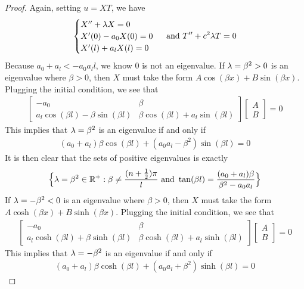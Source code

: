 \documentclass{report}
\begin{document}
\begin{proof}
Again, setting $u=XT$, we have 
 \begin{align*}
\begin{cases}
  X''+ \lambda X=0 \\
  X'(0)-a_0X(0)=0 \\
  X'(l)+a_lX(l)=0
\end{cases}\text{ and }T''+c^2 \lambda  T=0
\end{align*}
Because $a_0+a_l<-a_0a_ll$, we know $0$ is not an eigenvalue. If $\lambda =\beta ^2 >0$ is an eigenvalue where $\beta >0$, then $X$ must take the form  $A\cos (\beta x)+B \sin (\beta x)$. Plugging the initial condition, we see that 
\begin{align*}
\begin{bmatrix}
  -a_0 & \beta \\
  a_l \cos (\beta l) - \beta \sin (\beta l) & \beta  \cos (\beta l)+ a_l \sin (\beta l) 
\end{bmatrix}\begin{bmatrix}
A \\
B
\end{bmatrix}=0
\end{align*}
This implies that $\lambda =\beta ^2$ is an eigenvalue if and only if 
\begin{align}
  (a_0+a_l)\beta  \cos (\beta l)+ (a_0a_l-\beta ^2)\sin (\beta l)=0
\end{align}
It is then clear that the sets of positive eigenvalues is exactly 
\begin{align*}
\Big\{ \lambda =\beta ^2\in\mathbb{R}^+:\beta \neq \frac{(n+ \frac{1}{2})\pi }{l}\text{ and }\tan (\beta l)= \frac{(a_0+a_l)\beta }{\beta ^2- a_0a_l}  \Big\}
\end{align*}
If $\lambda =-\beta ^2<0$ is an eigenvalue where $\beta >0$, then $X$ must take the form  $A\cosh (\beta x)+ B\sinh (\beta x)$. Plugging the initial condition, we see that 
\begin{align*}
  \begin{bmatrix}
    -a_0 & \beta \\
    a_l \cosh (\beta l) + \beta \sinh (\beta l) & \beta  \cosh (\beta l)+a_l \sinh (\beta l)
  \end{bmatrix}
\begin{bmatrix}
A \\
B
\end{bmatrix}=0 
\end{align*}
This implies that $\lambda =-\beta ^2$ is an eigenvalue if and only if 
\begin{align*}
  (a_0+a_l)\beta \cosh (\beta l)+ (a_0a_l+\beta ^2)\sinh (\beta l)=0 

\end{align*}
\end{proof}
\end{document}
